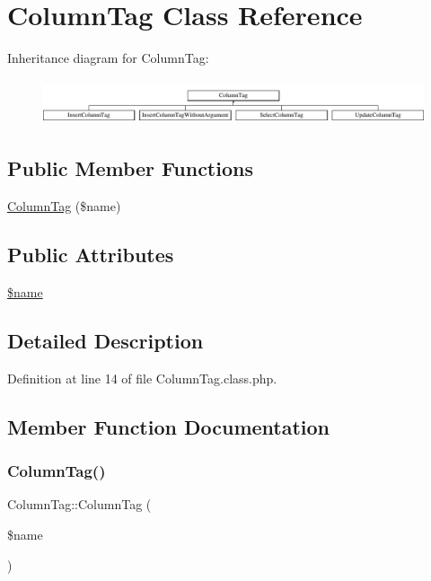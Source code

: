 \hypertarget{classColumnTag}{}\section{Column\+Tag Class Reference}
\label{classColumnTag}
Inheritance diagram for Column\+Tag\+:\begin{figure}[H]
\begin{center}
\leavevmode
\includegraphics[height=1.339713cm]{classColumnTag}
\end{center}
\end{figure}
\subsection*{Public Member Functions}
\begin{DoxyCompactItemize}
\item 
\hyperlink{classColumnTag_a0bea3e9971339117978a91ae0e468474}{Column\+Tag} (\$name)
\end{DoxyCompactItemize}
\subsection*{Public Attributes}
\begin{DoxyCompactItemize}
\item 
\hyperlink{classColumnTag_a46a615aa1822a191d42274fc5d6d79b1}{\$name}
\end{DoxyCompactItemize}


\subsection{Detailed Description}


Definition at line 14 of file Column\+Tag.\+class.\+php.



\subsection{Member Function Documentation}
\mbox{\label{classColumnTag_a0bea3e9971339117978a91ae0e468474}} 
\subsubsection{\texorpdfstring{Column\+Tag()}{ColumnTag()}}
{\footnotesize\ttfamily Column\+Tag\+::\+Column\+Tag (\begin{DoxyParamCaption}\item[{}]{\$name }\end{DoxyParamCaption})}

